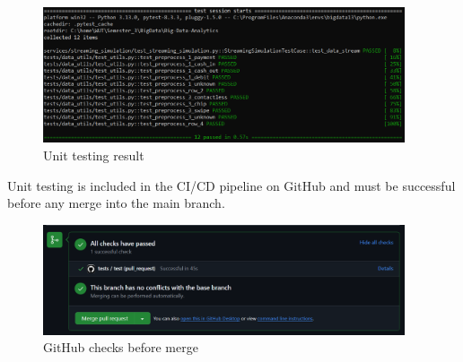 \documentclass[12pt,a4paper, hidelinks]{article}
\begin{document}
\begin{figure}[htbp]
  \centering
  \includegraphics[width=0.95\textwidth]{images/unittests-M2.png}
  \caption{Unit testing result}
  \label{fig:sunset}
\end{figure}

Unit testing is included in the CI/CD pipeline on GitHub and must be successful before any merge into the main branch.

\begin{figure}[htbp]
  \centering
  \includegraphics[width=0.95\textwidth]{images/github-checks-M2.PNG}
  \caption{GitHub checks before merge}
  \label{fig:sunset}
\end{figure}
\end{document}
